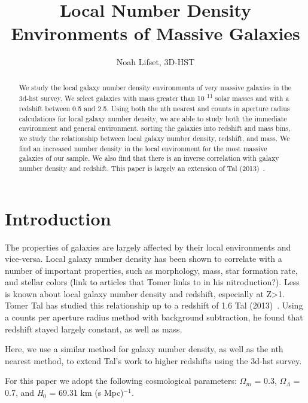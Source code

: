 \documentclass[apj]{emulateapj}
\begin{document}
 
\title{Local Number Density Environments of Massive Galaxies}

\author{Noah Lifset, 3D-HST}

\begin{abstract}

We study the local galaxy number density environments of very massive galaxies in the 3d-hst survey. We select galaxies with mass greater than 10 \textsuperscript{11} solar masses and with a redshift between 0.5 and 2.5. Using both the nth nearest and counts in aperture radius calculations for local galaxy number density, we are able to study both the immediate environment and general environment. sorting the galaxies into  redshift and mass bins, we study the relationship between local galaxy number density, redshift, and mass. We find an increased number density in the local environment for the most massive galaxies of our sample. We also find that there is an inverse correlation with galaxy number density and redshift. This paper is largely an extension of Tal (2013)~\cite{2013ApJ...769...31T}.

\end{abstract}
\keywords{}

\section{Introduction}

The properties of galaxies are largely affected by their local environments and vice-versa. Local galaxy number density has been shown to correlate with a number of important properties, such as morphology, mass, star formation rate, and stellar colors (link to articles that Tomer links to in his nitroduction?). Less is known about local galaxy number density and redshift, especially at Z\textgreater1. Tomer Tal has studied this relationship up to a redshift of 1.6 Tal (2013)~\cite{2013ApJ...769...31T}. Using a counts per aperture radius method with background subtraction, he found that redshift stayed largely constant, as well as mass.

Here, we use a similar method for galaxy number density, as well as the nth nearest method, to extend Tal's work to higher redshifts using the 3d-hst survey.

For this paper we adopt the following cosmological parameters: $\Omega_{m}$ = 0.3, $\Omega_{\Lambda}$ = 0.7, and \textit{H}$_{0}$ = 69.31 km (s Mpc)$^{-1}$.
\end{document}
